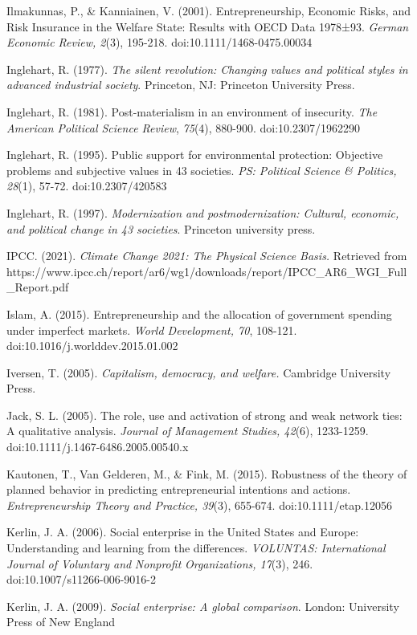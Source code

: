 \documentclass{article}
\begin{document}
Ilmakunnas, P., \& Kanniainen, V. (2001). Entrepreneurship, Economic Risks, and Risk Insurance in the Welfare State: Results with OECD Data 1978±93. \emph{German Economic Review, 2}(3), 195-218. doi:10.1111/1468-0475.00034

Inglehart, R. (1977). \emph{The silent revolution: Changing values and political styles in advanced industrial society}. Princeton, NJ: Princeton University Press.

Inglehart, R. (1981). Post-materialism in an environment of insecurity. \emph{The American Political Science Review}, \emph{75}(4), 880-900. doi:10.2307/1962290

Inglehart, R. (1995). Public support for environmental protection: Objective problems and subjective values in 43 societies. \emph{PS: Political Science \& Politics, 28}(1), 57-72. doi:10.2307/420583

Inglehart, R. (1997). \emph{Modernization and }\emph{postmodernization}\emph{: Cultural, economic, and political change in 43 societies}. Princeton university press.

IPCC. (2021). \emph{Climate Change 2021: The Physical Science Basis. }Retrieved from https://www.ipcc.ch/report/ar6/wg1/downloads/report/IPCC\_AR6\_WGI\_Full\_Report.pdf

Islam, A. (2015). Entrepreneurship and the allocation of government spending under imperfect markets. \emph{World Development, 70}, 108-121. doi:10.1016/j.worlddev.2015.01.002

Iversen, T. (2005). \emph{Capitalism, democracy, and welfare.} Cambridge University Press.

Jack, S. L. (2005). The role, use and activation of strong and weak network ties: A qualitative analysis. \emph{Journal of Management Studies, 42}(6), 1233-1259. doi:10.1111/j.1467-6486.2005.00540.x

Kautonen, T., Van Gelderen, M., \& Fink, M. (2015). Robustness of the theory of planned behavior in predicting entrepreneurial intentions and actions. \emph{Entrepreneurship Theory and Practice, 39}(3), 655-674. doi:10.1111/etap.12056

Kerlin, J. A. (2006). Social enterprise in the United States and Europe: Understanding and learning from the differences. \emph{VOLUNTAS: International Journal of Voluntary and }\emph{Nonprofit}\emph{ Organizations, 17}(3), 246. doi:10.1007/s11266-006-9016-2

Kerlin, J. A. (2009). \emph{Social enterprise: A global comparison}. London: University Press of New England
\end{document}
